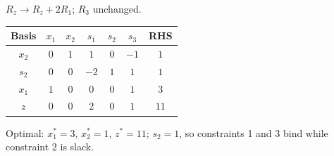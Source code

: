 \begin{solutions}
        $R_z\to R_z+2R_1$; $R_3$ unchanged.
        \begin{center}
        \begin{tabular}{c|ccccc|c}
        Basis & $x_1$ & $x_2$ & $s_1$ & $s_2$ & $s_3$ & RHS\\
        \hline
        $x_2$ & $0$ & $1$ & $1$ & $0$ & $-1$ & $1$\\
        $s_2$ & $0$ & $0$ & $-2$ & $1$ & $1$ & $1$\\
        $x_1$ & $1$ & $0$ & $0$ & $0$ & $1$ & $3$\\
        \hline
        $z$ & $0$ & $0$ & $2$ & $0$ & $1$ & $11$\\
        \end{tabular}
        \end{center}
        Optimal: $x_1^{*}=3$, $x_2^{*}=1$, $z^{*}=11$; $s_2=1$, so
        constraints 1 and 3 bind while constraint 2 is slack.


\end{solutions}
